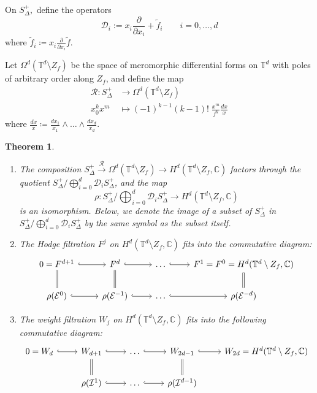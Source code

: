 \documentclass[11pt, reqno]{amsart}
\theoremstyle{plain}
\newtheorem{thm}{Theorem}[section]
\theoremstyle{definition}
\newcommand{\CC}{\mathbb{C}}
\newcommand{\TT}{\mathbb{T}}
\begin{document}
On $S_\Delta^+,$ define the operators 
\begin{equation*}
\label{eq:op-Di}
\mathcal{D}_i := x_i\frac{\partial}{\partial x_i} + \widetilde{f}_i \qquad i=0,\dots,d
\end{equation*}
where  $\widetilde{f}_i \coloneqq x_i \frac{\partial}{\partial x_i} \widetilde{f}.$ 

Let $\Omega^d(\TT^d \setminus Z_f)$ be the space of meromorphic differential forms on $\TT^d$ with  poles  of arbitrary order along $Z_f$, and define the map 
\begin{align*}
    \mathcal{R}: S_\Delta^+ &\to  \Omega^d(\TT^d \setminus Z_f)\\
    x_0^k x^m &\mapsto (-1)^{k-1} (k-1)!  \; \frac{x^m }{f^k } \frac{dx}{x}
\end{align*}
where $\frac{dx}{x}\coloneqq \frac{dx_1}{x_1}\wedge\dots \wedge \frac{dx_d}{x_d}$.

\begin{thm}{\cite[Theorem 7.13, Theorem 8.1, Theorem 8.2]{Batyrev-tori}}
\label{thm:Baty-summary} \hfill
\begin{enumerate}
    \item The composition 
    $S_\Delta^+ \xrightarrow{\mathcal{R}} \Omega^d(\TT^d\setminus Z_f) \to H^d(\TT^d\setminus Z_f, \CC)$
    factors through the quotient $S_\Delta^+/ \bigoplus_{i=0}^d \mathcal{D}_i S_\Delta^+$, and the map
    \[
    \rho: S_\Delta^+/ \bigoplus_{i=0}^d \mathcal{D}_i S_\Delta^+ \to H^d(\TT^d\setminus Z_f, \CC)
    \] is an isomorphism. Below, we denote the image of a subset of $S_{\Delta}^+$ in $S_\Delta^+/  \bigoplus_{i=0}^d \mathcal{D}_i S_\Delta^+$ by the same symbol as the subset itself.
    \item The Hodge filtration $F^j$ on $H^d(\TT^d \setminus Z_f,\CC)$ fits into the commutative diagram:
    \begin{equation*}
    \begin{tikzcd}
    0=F^{d+1}\ar[r, hook] \ar[d,equal] & F^d \ar[r, hook]\ar[d,equal] & \dots \ar[r,hook]  &F^{1} = F^0 
    = H^d(\TT^d \setminus Z_f, \CC)
    \ar[d,equal] 
    \\
    \rho(\mathcal{E}^0) \ar[r, hook] & \rho(\mathcal{E}^{-1}) \ar[r,hook] & \dots  \ar[r,hook] & \rho(\mathcal{E}^{-d})
    \end{tikzcd} 
    \end{equation*}
    \item The weight filtration $W_j$ on $H^d(\TT^d \setminus Z_f,\CC)$ fits into the following commutative diagram: 
    \begin{equation*} 
    \begin{tikzcd}
    0=W_d\ar[r, hook]  & W_{d+1} \ar[r, hook] \ar[d,equal]  & \dots \ar[r, hook] &W_{2d-1} \ar[d,equal]\ar[r,hook]  & W_{2d} = H^d(\TT^d \setminus Z_f,\CC) \\
    & \rho(\mathcal{I}^{1}) \ar[r,hook] & \dots  \ar[r,hook] & \rho(\mathcal{I}^{d-1})   & 
    \end{tikzcd} 
    \end{equation*}
    \end{enumerate}
\end{thm}
\end{document}
